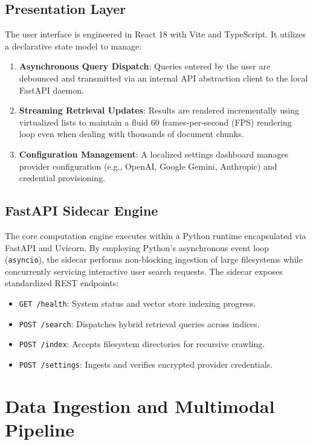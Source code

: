 \documentclass[pdflatex,sn-mathphys-num]{sn-jnl}%
\theoremstyle{thmstyleone}%
\theoremstyle{thmstyletwo}%
\theoremstyle{thmstylethree}%
\begin{document}
\subsection{Presentation Layer}\label{subsec3_2}
The user interface is engineered in React 18 with Vite and TypeScript. It utilizes a declarative state model to manage:
\begin{enumerate}
    \item \textbf{Asynchronous Query Dispatch}: Queries entered by the user are debounced and transmitted via an internal API abstraction client to the local FastAPI daemon.
    \item \textbf{Streaming Retrieval Updates}: Results are rendered incrementally using virtualized lists to maintain a fluid 60 frames-per-second (FPS) rendering loop even when dealing with thousands of document chunks.
    \item \textbf{Configuration Management}: A localized settings dashboard manages provider configuration (e.g., OpenAI, Google Gemini, Anthropic) and credential provisioning.
\end{enumerate}

\subsection{FastAPI Sidecar Engine}\label{subsec3_3}
The core computation engine executes within a Python runtime encapsulated via FastAPI and Uvicorn. By employing Python's asynchronous event loop (\texttt{asyncio}), the sidecar performs non-blocking ingestion of large filesystems while concurrently servicing interactive user search requests. The sidecar exposes standardized REST endpoints:
\begin{itemize}
    \item \texttt{GET /health}: System status and vector store indexing progress.
    \item \texttt{POST /search}: Dispatches hybrid retrieval queries across indices.
    \item \texttt{POST /index}: Accepts filesystem directories for recursive crawling.
    \item \texttt{POST /settings}: Ingests and verifies encrypted provider credentials.
\end{itemize}

\section{Data Ingestion and Multimodal Pipeline}\label{sec4}
\end{document}
